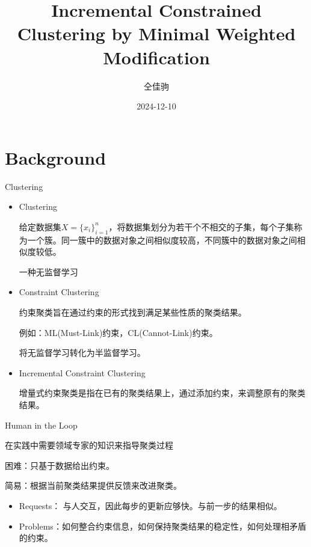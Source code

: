 \documentclass{beamer}
\author{仝佳驹}
\title{Incremental Constrained Clustering by Minimal
Weighted Modification}
\date{2024-12-10}
\begin{document}
\begin{frame}
    \titlepage
\end{frame}


\section{Background}

\begin{frame}{Clustering}
\begin{itemize}
\item Clustering

给定数据集$X=\{x_i\}_{i=1}^n$，将数据集划分为若干个不相交的子集，每个子集称为一个簇。同一簇中的数据对象之间相似度较高，不同簇中的数据对象之间相似度较低。

一种无监督学习

\item Constraint Clustering

约束聚类旨在通过约束的形式找到满足某些性质的聚类结果。

例如：ML(Must-Link)约束，CL(Cannot-Link)约束。

将无监督学习转化为半监督学习。

\item Incremental Constraint Clustering

增量式约束聚类是指在已有的聚类结果上，通过添加约束，来调整原有的聚类结果。
\end{itemize}
\end{frame}

\begin{frame}{Human in the Loop}

在实践中需要领域专家的知识来指导聚类过程

困难：只基于数据给出约束。

简易：根据当前聚类结果提供反馈来改进聚类。
    
\begin{itemize}
\item Requests：
与人交互，因此每步的更新应够快。与前一步的结果相似。

\item Problems：如何整合约束信息，如何保持聚类结果的稳定性，如何处理相矛盾的约束。

\end{itemize}

\end{frame}
\end{document}

